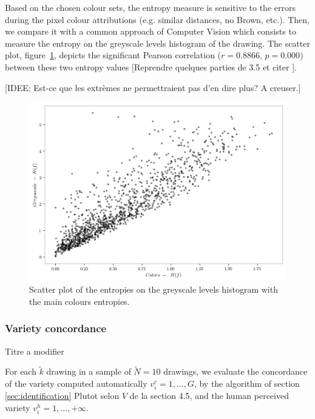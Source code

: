 \documentclass[11pt,a4paper]{article}
\begin{document}
Based on the chosen colour sets, the entropy measure is sensitive to the errors during the pixel colour attributions (e.g. similar distances, no Brown, etc.). 
Then, we compare it with a common approach of Computer Vision which consists to measure the entropy on the greyscale levels histogram of the drawing. 
The scatter plot, figure~\ref{fig:entropies}, depicts the significant Pearson correlation ($r=0.8866$, $p=0.000$) between these two entropy values {\color{red}[Reprendre quelques parties de 3.5 et citer \citet{wu2013}]}. 

{\small \color{teal}[IDEE: Est-ce que les extr\`emes ne permettraient pas d'en dire plus? A creuser.]}

\begin{figure}[h!]
	\centering
	\includegraphics[width=\linewidth]{figures/colors-greysacale-entropies.png}
	\caption{Scatter plot of the entropies on the greyscale levels histogram with the main colours entropies.}
	\label{fig:entropies}
\end{figure}

\subsubsection{Variety concordance} {\color{red} Titre a modifier}
\label{sec:results_variety_concordance}

For each $\tilde{k}$ drawing in a sample of $\tilde{N} = 10$ drawings, we evaluate the concordance of the variety computed automatically $v^c_i = {1, \dots, G}$, by the algorithm of section \ref{sec:identification} {\color{red} Plutot selon $V$ de la section 4.5}, and the human perceived variety $v^h_i = {1, \dots, +\infty}$. 
\end{document}
